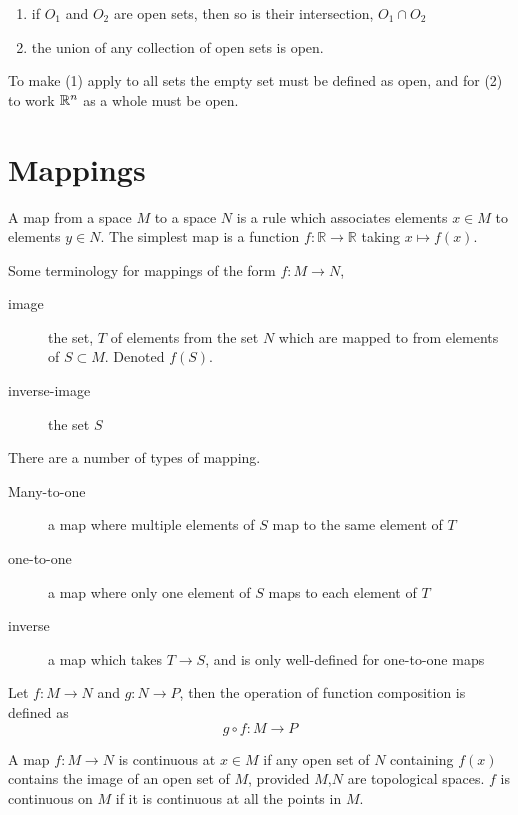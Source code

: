 \begin{enumerate}
\item
  if \(O_1\) and \(O_2\) are open sets, then so is their intersection,
  \(O_1 \cap O_2\)
\item
  the union of any collection of open sets is open.
\end{enumerate}

To make (1) apply to all sets the empty set must be defined as open, and
for (2) to work \(\mathbb{R}^n\) as a whole must be open.

\section{Mappings}\label{mappings}

A map from a space \(M\) to a space \(N\) is a rule which associates
elements \(x \in M\) to elements \(y \in N\). The simplest map is a
function \(f:\mathbb{R} \to \mathbb{R}\) taking \(x \mapsto f(x)\).

Some terminology for mappings of the form \(f:M \to N\),

\begin{description}
\item[image]
the set, \(T\) of elements from the set \(N\) which are mapped to from
elements of \(S \subset M\). Denoted \(f(S)\).
\item[inverse-image]
the set \(S\)
\end{description}

There are a number of types of mapping.

\begin{description}
\item[Many-to-one]
a map where multiple elements of \(S\) map to the same element of \(T\)
\item[one-to-one]
a map where only one element of \(S\) maps to each element of \(T\)
\item[inverse]
a map which takes \(T \to S\), and is only well-defined for one-to-one
maps
\end{description}

Let \(f:M \to N\) and \(g: N \to P\), then the operation of function
composition is defined as \[g \circ f : M \to P\]

A map \(f:M \to N\) is continuous at \(x \in M\) if any open set of
\(N\) containing \(f(x)\) contains the image of an open set of \(M\),
provided \(M\),\(N\) are topological spaces. \(f\) is continuous on
\(M\) if it is continuous at all the points in \(M\).

